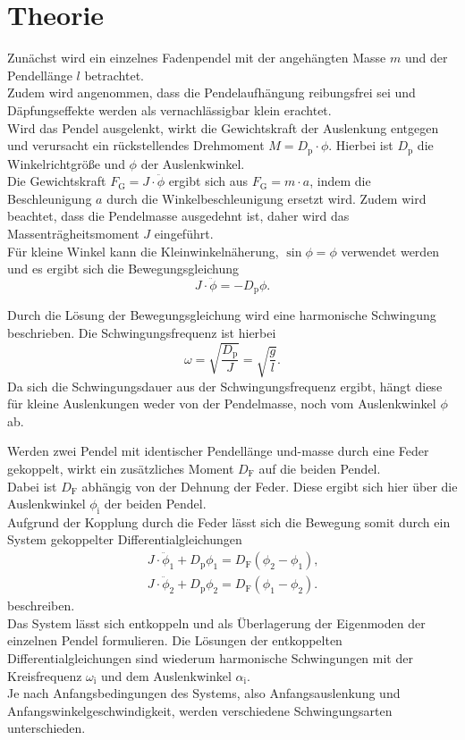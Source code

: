 \section{Theorie}
\label{sec:Theorie}
Zunächst wird ein einzelnes Fadenpendel mit der angehängten Masse $m$ und der Pendellänge $l$ betrachtet. \\
Zudem wird angenommen, dass die Pendelaufhängung reibungsfrei sei und Däpfungseffekte werden als vernachlässigbar klein erachtet.\\
Wird das Pendel ausgelenkt, wirkt die Gewichtskraft der Auslenkung entgegen und verursacht ein rückstellendes Drehmoment $M=D_{\mathrm{p}}\cdot \phi$.
Hierbei ist $D_{\mathrm{p}}$ die Winkelrichtgröße und $\phi$ der Auslenkwinkel.\\
Die Gewichtskraft $F_{\mathrm{G}}=J\cdot\ddot\phi$ ergibt sich aus $F_{\mathrm{G}}=m\cdot a$, indem die Beschleunigung $a$ durch die Winkelbeschleunigung ersetzt wird.
Zudem wird beachtet, dass die Pendelmasse ausgedehnt ist, daher wird das Massenträgheitsmoment $J$ eingeführt. \\
Für kleine Winkel kann die Kleinwinkelnäherung, $\sin{\phi}=\phi$ verwendet werden und es ergibt sich die Bewegungsgleichung
\begin{equation}
	J\cdot \ddot\phi=-D_{\mathrm{p}}\phi \text{.}
\end{equation}

Durch die Lösung der Bewegungsgleichung wird eine harmonische Schwingung beschrieben. Die Schwingungsfrequenz ist hierbei
\begin{equation}
	\omega=\sqrt{\frac{D_{\mathrm{p}}}{J}}=\sqrt{\frac{g}{l}} \text{.}
\end{equation}
Da sich die Schwingungsdauer aus der Schwingungsfrequenz ergibt, hängt diese für kleine Auslenkungen weder von der Pendelmasse, noch vom Auslenkwinkel $\phi$ ab.

Werden zwei Pendel mit identischer Pendellänge und-masse durch eine Feder gekoppelt, wirkt ein zusätzliches Moment $D_{\mathrm{F}}$ auf die beiden Pendel.\\
Dabei ist $D_{\mathrm{F}}$ abhängig von der Dehnung der Feder. Diese ergibt sich hier über die Auslenkwinkel $\phi_{\mathrm{i}}$ der beiden Pendel.\\
Aufgrund der Kopplung durch die Feder lässt sich die Bewegung somit durch ein System gekoppelter Differentialgleichungen
\begin{gather}
	J\cdot \ddot \phi_1 + D_{\mathrm{p}} \phi_1=D_{\mathrm{F}}(\phi_2-\phi_1)\text{,}\\
	J\cdot \ddot \phi_2 + D_{\mathrm{p}} \phi_2=D_{\mathrm{F}}(\phi_1-\phi_2)\text{.}
\end{gather}
beschreiben.\\
Das System lässt sich entkoppeln und als Überlagerung der Eigenmoden der einzelnen Pendel formulieren.
Die Lösungen der entkoppelten Differentialgleichungen sind wiederum harmonische Schwingungen mit der Kreisfrequenz $\omega_{\mathrm{i}}$ und dem Auslenkwinkel $\alpha_{\mathrm{i}}$.\\
Je nach Anfangsbedingungen des Systems, also Anfangsauslenkung und Anfangswinkelgeschwindigkeit, werden verschiedene Schwingungsarten unterschieden.
